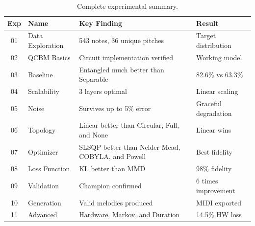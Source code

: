 \documentclass[11pt,a4paper]{article}
\begin{document}
\begin{table}[H]
\centering
\small
\begin{tabular}{clp{5.5cm}l}
\toprule
\textbf{Exp} & \textbf{Name} & \textbf{Key Finding} & \textbf{Result} \\
\midrule
01 & Data Exploration & 543 notes, 36 unique pitches & Target distribution \\
02 & QCBM Basics & Circuit implementation verified & Working model \\
03 & Baseline & Entangled much better than Separable & 82.6\% vs 63.3\% \\
04 & Scalability & 3 layers optimal & Linear scaling \\
05 & Noise & Survives up to 5\% error & Graceful degradation \\
06 & Topology & Linear better than Circular, Full, and None & Linear wins \\
07 & Optimizer & SLSQP better than Nelder-Mead, COBYLA, and Powell & Best fidelity \\
08 & Loss Function & KL better than MMD & 98\% fidelity \\
09 & Validation & Champion confirmed & 6 times improvement \\
10 & Generation & Valid melodies produced & MIDI exported \\
11 & Advanced & Hardware, Markov, and Duration & 14.5\% HW loss \\
\bottomrule
\end{tabular}
\caption{Complete experimental summary.}
\label{tab:summary}
\end{table}

\clearpage

\printbibliography[title={Bibliography}]
\end{document}
